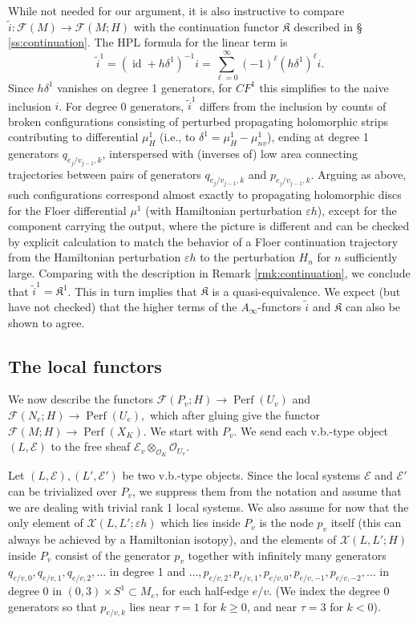 \documentclass[11pt,leqno]{amsart}
\numberwithin{equation}{section}
\newcommand{\cF}{{\mathcal F}}
\newcommand{\cO}{{\mathcal O}}
\newcommand{\cE}{{\mathcal E}}
\newcommand{\cX}{{\mathcal X}}
\newcommand{\Perf}{\operatorname{Perf}}
\newcommand{\id}{\operatorname{id}}
\begin{document}
While not needed for our argument, it is also instructive to compare $\tilde{i}:\cF(M)\to
\cF(M;H)$ with the continuation functor $\mathfrak{K}$ described in \S
\ref{ss:continuation}. The HPL formula for the linear term is
$$\tilde{i}^1=(\id+h\delta^1)^{-1}i=\sum_{\ell=0}^\infty
(-1)^\ell (h\delta^1)^\ell i.$$
Since $h\delta^1$ vanishes on degree 1 generators, for $CF^1$ this
simplifies to the naive inclusion $i$. For degree 0 generators,
$\tilde{i}^1$ differs from the inclusion by counts of broken configurations consisting of
perturbed propagating holomorphic strips contributing to
differential $\mu^1_H$ (i.e., to $\delta^1=\mu^1_H-\mu^1_{nv}$), ending at
degree 1 generators $q_{e_j/v_{j-1},k}$, interspersed with (inverses of) low area
connecting trajectories between pairs of generators $q_{e_j/v_{j-1},k}$ and
$p_{e_j/v_{j-1},k}$. Arguing as above, such configurations correspond
almost exactly to propagating holomorphic discs for the Floer differential
$\mu^1$ (with Hamiltonian perturbation $\varepsilon h$), except for the 
component carrying the output, where the picture is different and can be
checked by explicit calculation to match the behavior of a Floer
continuation trajectory from the Hamiltonian perturbation $\varepsilon h$ to
the perturbation $H_n$ for $n$ sufficiently large. Comparing with the
description in Remark \ref{rmk:continuation}, we conclude that
$\tilde{i}^1=\mathfrak{K}^1$. This in turn implies that $\mathfrak{K}$ is a 
quasi-equivalence. We expect (but have not checked) that the higher terms
of the $A_\infty$-functors $\tilde{i}$ and $\mathfrak{K}$ can also be shown
to agree.

\subsection{The local functors}\label{ss:localfunctors}

We now describe the functors $\cF(P_v;H)\to \Perf(U_v)$ and $\cF(N_e;H)\to \Perf(U_e),$ which after gluing give the functor $\cF(M;H)\to\Perf(X_K).$ 
We start with $P_v.$ We send each v.b.-type object $(L,\cE)$ to the free sheaf $\cE_{v}\otimes_{\cO_K}\cO_{U_v}.$ 

Let $(L,\cE),(L',\cE')$ be two v.b.-type objects. Since the local
systems $\cE$ and $\cE'$ can be trivialized over $P_v$, we suppress them from the
notation and assume that we are dealing with trivial rank 1 local systems. We also assume for now that
the only element of $\cX(L,L';\varepsilon h)$ which lies inside $P_v$ is the node $p_v$ 
itself (this can always be achieved by a Hamiltonian isotopy), and the elements of $\cX(L,L';H)$ inside $P_v$ consist of the
generator $p_v$ together with infinitely many generators
$q_{e/v,0},q_{e/v,1},q_{e/v,2},\dots$ in degree 1 and $\dots,
p_{e/v,2},p_{e/v,1},p_{e/v,0},p_{e/v,-1},p_{e/v,-2},\dots$ in degree 0 in
$(0,3)\times S^1 \subset M_e$, for each half-edge $e/v$.
(We index the degree 0 generators so that $p_{e/v,k}$ lies near $\tau=1$ for $k\geq 0$, and
near $\tau=3$ for $k<0$).
\end{document}
